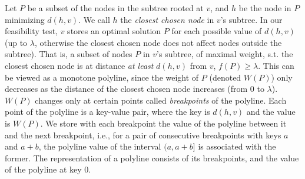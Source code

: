 \documentclass[11pt,a4paper]{article}
\theoremstyle{definition}
\theoremstyle{remark}
\begin{document}
Let $P$ be a subset of the nodes in the subtree rooted at $v$, and  $h$ be the node in $P$ minimizing $d(h,v)$. We call $h$ the {\em closest chosen node} in $v$'s subtree. In our feasibility test, $v$ stores an optimal solution $P$ for each possible value of $d(h,v)$ (up to $\lambda$, otherwise the closest chosen node does not affect nodes outside the subtree). That is, a subset of nodes $P$ in $v$'s subtree, of maximal weight, s.t. the closest chosen node is at distance {\em at least} $d(h,v)$ from $v$, $f(P) \ge \lambda$. 
This can be viewed as a monotone polyline, since the weight of $P$ (denoted $W(P)$) only decreases as the distance of the closest chosen node increases (from 0 to $\lambda$). $W(P)$ changes only at certain points called {\em breakpoints} of the polyline. Each point of the polyline is a key-value pair, where the key is $d(h,v)$ and the value is $W(P)$. We store with each breakpoint the value of the polyline between it and the next breakpoint,
i.e., for a pair of consecutive breakpoints with keys $a$ and $a+b$, the polyline value of the interval $(a,a+b]$ is associated with the former.
The representation of a polyline consists of its breakpoints, and the value of the polyline at key 0.
\end{document}
